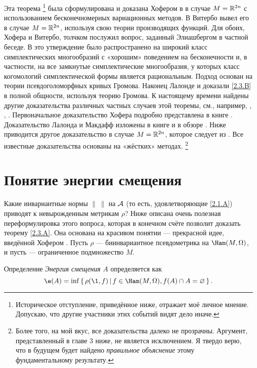 Эта теорема%
\footnote{Историческое отступление, приведённое ниже, отражает моё личное мнение.
Допускаю, что другие участники этих событий видят дело иначе.}
была сформулирована и доказана Хофером в \cite{H1} в случае $M = \mathbb{R}^{2n}$ с использованием бесконечномерных вариационных методов.
В \cite{V1} Витербо вывел его в случае $M = \mathbb{R}^{2n}$, используя свою теории производящих функций.
Для обоих, Хофера и Витербо, толчком послужил вопрос, заданный Элиашбергом в частной беседе.
В \cite{P1} это утверждение было распространено на широкий класс симплектических многообразий с «хорошим» поведением на бесконечности и, в частности, на все замкнутые симплектические многообразия, у которых класс когомологий симплектической формы является рациональным.
Подход \cite{P1} основан на теории псевдоголоморфных кривых Громова.
Наконец \cite{LM1} Лалонде и  доказали \ref{2.3.B} в полной общности, используя теорию Громова.
К настоящему времени найдены другие доказательства различных частных случаев этой теоремы, см., например, \cite{Ch}, \cite{O3}, \cite{Sch3}.
Первоначальное доказательство Хофера подробно представлена в книге
\cite{HZ}.
Доказательство Лалонда и Макдафф изложены в книге \cite{MS} и в обзоре \cite{L}.
Ниже приводится другое доказательство в случае $M = \mathbb{R}^{2n}$, которое следует из \cite{P1}.
Все известные доказательства основаны на «жёстких» методах.%
\footnote{Более того, на мой вкус, все доказательства далеко не прозрачны.
Аргумент, представленный в главе 3 ниже, не является исключением.
Я твердо верю, что в будущем будет найдено \emph{правильное объяснение} этому фундаментальному результату.}

\section{Понятие энергии смещения}\label{sec:2.4}

Какие инвариантные нормы $\|\ \|$ на $\mathcal{A}$ (то есть, удовлетворяющие \ref{2.1.A}) приводят к невырожденным метрикам $\rho$?
Ниже описана очень полезная переформулировка этого вопроса, которая в конечном счёте позволит доказать теорему \ref{2.3.A}.
Она основана на красивом понятии  --- прекрасной идее, введённой Хофером \cite{H1}.
Пусть $\rho$ --- биинвариантное псевдометрика на $\Ham (M, \Omega)$, и пусть  --- ограниченное подмножество $M$.

\begin{ex*}{Определение}
\emph{Энергия смещения $A$} определяется как
\[\e(A) = \inf \set{\rho (\1, f)}{f \in \Ham (M, \Omega), f (A) \cap A = \emptyset}.\]
\end{ex*}

